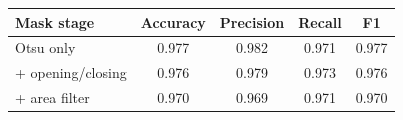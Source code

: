 \begin{tabular}{@{}lcccc@{}}
\toprule
Mask stage & Accuracy & Precision & Recall & F1 \\
\midrule
Otsu only & 0.977 & 0.982 & 0.971 & 0.977 \\
+ opening/closing & 0.976 & 0.979 & 0.973 & 0.976 \\
+ area filter & 0.970 & 0.969 & 0.971 & 0.970 \\
\bottomrule
\end{tabular}
